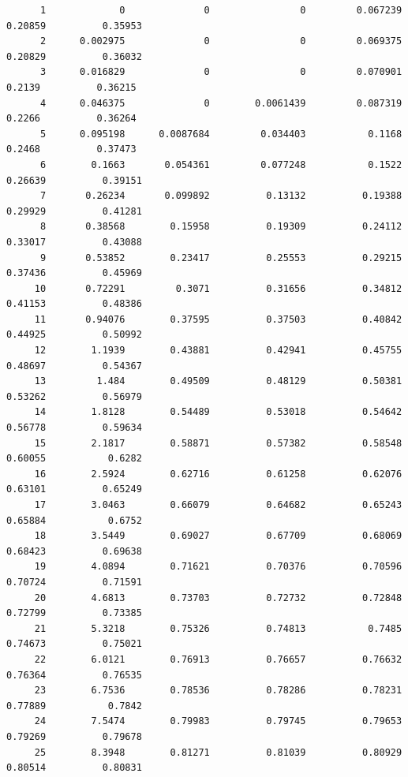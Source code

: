 \documentclass[
]{book}
\begin{document}
\begin{verbatim}
      1             0              0                0         0.067239          0.20859          0.35953   
      2      0.002975              0                0         0.069375          0.20829          0.36032   
      3      0.016829              0                0         0.070901           0.2139          0.36215   
      4      0.046375              0        0.0061439         0.087319           0.2266          0.36264   
      5      0.095198      0.0087684         0.034403           0.1168           0.2468          0.37473   
      6        0.1663       0.054361         0.077248           0.1522          0.26639          0.39151   
      7       0.26234       0.099892          0.13132          0.19388          0.29929          0.41281   
      8       0.38568        0.15958          0.19309          0.24112          0.33017          0.43088   
      9       0.53852        0.23417          0.25553          0.29215          0.37436          0.45969   
     10       0.72291         0.3071          0.31656          0.34812          0.41153          0.48386   
     11       0.94076        0.37595          0.37503          0.40842          0.44925          0.50992   
     12        1.1939        0.43881          0.42941          0.45755          0.48697          0.54367   
     13         1.484        0.49509          0.48129          0.50381          0.53262          0.56979   
     14        1.8128        0.54489          0.53018          0.54642          0.56778          0.59634   
     15        2.1817        0.58871          0.57382          0.58548          0.60055           0.6282   
     16        2.5924        0.62716          0.61258          0.62076          0.63101          0.65249   
     17        3.0463        0.66079          0.64682          0.65243          0.65884           0.6752   
     18        3.5449        0.69027          0.67709          0.68069          0.68423          0.69638   
     19        4.0894        0.71621          0.70376          0.70596          0.70724          0.71591   
     20        4.6813        0.73703          0.72732          0.72848          0.72799          0.73385   
     21        5.3218        0.75326          0.74813           0.7485          0.74673          0.75021   
     22        6.0121        0.76913          0.76657          0.76632          0.76364          0.76535   
     23        6.7536        0.78536          0.78286          0.78231          0.77889           0.7842   
     24        7.5474        0.79983          0.79745          0.79653          0.79269          0.79678   
     25        8.3948        0.81271          0.81039          0.80929          0.80514          0.80831   

\end{verbatim}
\end{document}
